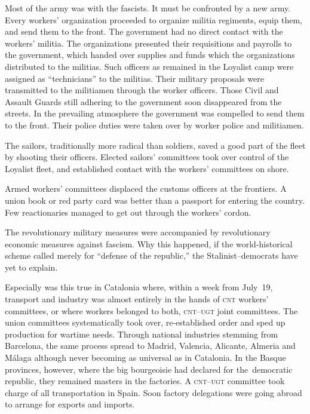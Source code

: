 Most of the army was with the fascists. It must be confronted by a new army. Every workers’ organization proceeded to organize militia regiments, equip them, and send them to the front. The government had no direct contact with the workers’ militia. The organizations presented their requisitions and payrolls to the government, which handed over supplies and funds which the organizations distributed to the militias. Such officers as remained in the Loyalist camp were assigned as ``technicians'' to the militias. Their military proposals were transmitted to the militiamen through the worker officers. Those Civil and Assault Guards still adhering to the government soon disappeared from the streets. In the prevailing atmosphere the government was compelled to send them to the front. Their police duties were taken over by worker police and militiamen.

The sailors, traditionally more radical than soldiers, saved a good part of the fleet by shooting their officers. Elected sailors’ committees took over control of the Loyalist fleet, and established contact with the workers’ committees on shore.

Armed workers’ committees displaced the customs officers at the frontiers. A union book or red party card was better than a passport for entering the country. Few reactionaries managed to get out through the workers’ cordon.
\nowidow

The revolutionary military measures were accompanied by revolutionary economic measures against fascism. Why this happened, if the world-historical scheme called merely for ``defense of the republic,'' the Stalinist--democrats have yet to explain.

\indexCNT\indexUGT{}
Especially was this true in Catalonia where, within a week from July~19, transport and industry was almost entirely in the hands of \textsc{cnt} workers’ committees, or where workers belonged to both, \textsc{cnt--ugt} joint committees. The union committees systematically took over, re-established order and sped up production for wartime needs. Through national industries stemming from Barcelona, the same process spread to Madrid, Valencia, Alicante, Almeria and M\'alaga although never becoming as universal as in Catalonia. In the Basque provinces, however, where the big bourgeoisie had declared for the~democratic republic, they remained masters in the factories. A \textsc{cnt--ugt} committee took charge of all transportation in Spain. Soon factory delegations were going abroad to arrange for exports and imports.


